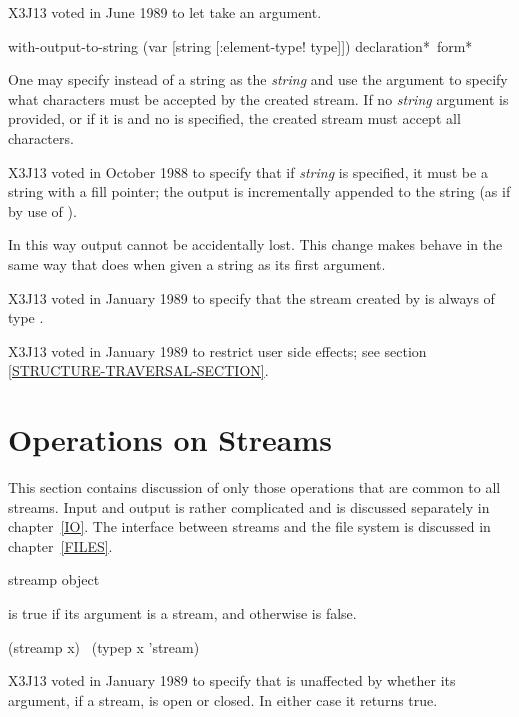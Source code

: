 \begin{newer}
X3J13 voted in June 1989 
to let  take an  argument.

\begin{defmac}
with-output-to-string (var [string [\!:element-type! type]])
                      {declaration}* {\,form}*

One may specify  instead of a string as the \emph{string}
and use the  argument to specify what characters
must be accepted by the created stream.  If no \emph{string} argument
is provided, or if it is  and no  is specified,
the created stream must accept all characters.

X3J13 voted in October 1988
to specify that
if \emph{string} is specified, it must be a string with a fill pointer;
the output is incrementally appended to the string (as if by use of
).

In this way output cannot be accidentally lost.  This change makes
 behave in the same way that  does
when given a string as its first argument.

X3J13 voted in January 1989
to specify that the stream created by
 is always of type .

X3J13 voted in January 1989
to restrict user side effects; see section \ref{STRUCTURE-TRAVERSAL-SECTION}.
\end{defmac}
\end{newer}

\section {Operations on Streams}

This section contains discussion of only those operations that
are common to all streams.  Input and output is rather complicated
and is discussed separately in chapter~\ref{IO}.
The interface between streams and the file system is discussed
in chapter~\ref{FILES}.

\begin{defun}[Function]
streamp object

 is true if its argument is a stream,
and otherwise is false.
\begin{lisp}
(streamp x) \EQ\ (typep x 'stream)
\end{lisp}

\begin{new}
X3J13 voted in January 1989
to specify that  is unaffected
by whether its argument, if a stream, is open or closed.  In either case
it returns true.
\end{new}
\end{defun}

